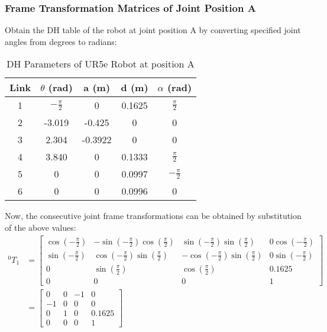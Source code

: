 \documentclass[fleqn]{article}
\begin{document}
\subsubsection{Frame Transformation Matrices of Joint Position A}
Obtain the DH table of the robot at joint position A by converting specified joint angles from degrees to radians:
\begin{table}[!ht]
    \caption{DH Parameters of UR5e Robot at position A}
    \begin{center}
    \begin{tabular}{||c | c | c | c | c||} 
     \hline
     Link & $\theta$ (rad) & a (m) & d (m) & $\alpha$ (rad)\\
     \hline\hline
     1 & $-\frac{\pi}{2}$ & 0 & 0.1625 & $\frac{\pi}{2}$ \\ [1ex] 
     \hline
     2 & -3.019 & -0.425 & 0 & 0 \\ [1ex] 
     \hline
     3 & 2.304 & -0.3922 & 0 & 0 \\ [1ex] 
     \hline
     4 & 3.840 & 0 & 0.1333 & $\frac{\pi}{2}$ \\ [1ex] 
     \hline
     5 & 0 & 0 & 0.0997 & $-\frac{\pi}{2}$ \\ [1ex] 
     \hline
     6 & 0 & 0 & 0.0996 & 0 \\ [1ex] 
     \hline
    \end{tabular}
    \end{center}
\end{table}

Now, the consecutive joint frame transformations can be obtained by substitution of the above values: 
\begin{equation}
\begin{split}
^{0}T_{1}&=\begin{bmatrix}
\cos(-\frac{\pi}{2}) & -\sin(-\frac{\pi}{2})\cos(\frac{\pi}{2}) & \sin(-\frac{\pi}{2})\sin(\frac{\pi}{2}) & 0\cos(-\frac{\pi}{2})\\
\sin(-\frac{\pi}{2}) & \cos(-\frac{\pi}{2})\sin(\frac{\pi}{2}) & -\cos(-\frac{\pi}{2})\sin(\frac{\pi}{2}) & 0\sin(-\frac{\pi}{2})\\
0 & \sin(\frac{\pi}{2}) & \cos(\frac{\pi}{2}) & 0.1625\\
0 & 0 & 0 & 1
\end{bmatrix}\\
&=\begin{bmatrix}
0 & 0 & -1 & 0\\
-1 & 0 & 0 & 0\\
0 & 1 & 0 & 0.1625\\
0 & 0 & 0 & 1
\end{bmatrix}
\end{split}
\end{equation}
\end{document}
